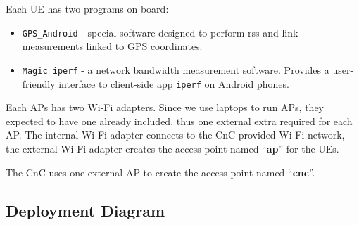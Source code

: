 Each UE has two programs on board:

\begin{itemize}
\tightlist
\item
  \texttt{GPS\_Android} - special software designed to perform \acrshort{rss} and  link measurements linked to GPS coordinates.
\item
  \texttt{Magic\ iperf} - a network bandwidth measurement software.  Provides a user-friendly interface to client-side app \texttt{iperf}  on Android phones.
\end{itemize}

Each APs has two Wi-Fi adapters. Since we use laptops to run APs, they expected to have one already included, thus one external extra required for each AP. The internal Wi-Fi adapter connects to the CnC provided Wi-Fi network, the external Wi-Fi adapter creates the access point named
``\textbf{ap}'' for the UEs.

The CnC uses one external AP to create the access point named
``\textbf{cnc}''.

\hypertarget{deployment-diagram}{%
\subsection{Deployment Diagram}\label{deployment-diagram}}


